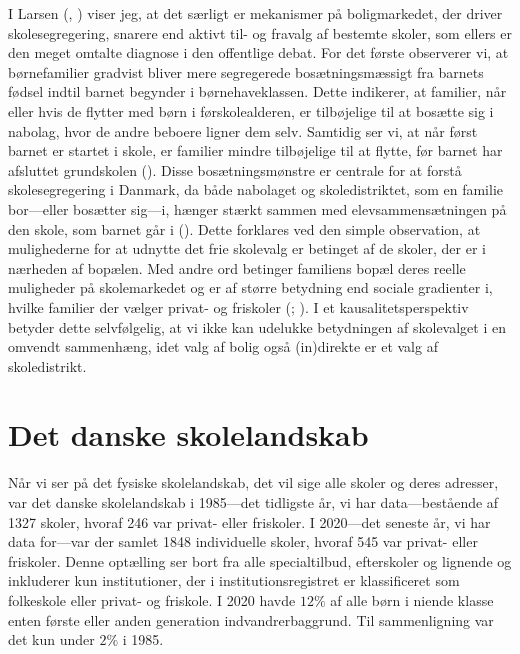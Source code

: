 \documentclass[
]{book}
\begin{document}
I Larsen (, ) viser jeg, at det særligt er mekanismer på boligmarkedet, der driver skolesegregering, snarere end aktivt til- og fravalg af bestemte skoler, som ellers er den meget omtalte diagnose i den offentlige debat. For det første observerer vi, at børnefamilier gradvist bliver mere segregerede bosætningsmæssigt fra barnets fødsel indtil barnet begynder i børnehaveklassen. Dette indikerer, at familier, når eller hvis de flytter med børn i førskolealderen, er tilbøjelige til at bosætte sig i nabolag, hvor de andre beboere ligner dem selv. Samtidig ser vi, at når først barnet er startet i skole, er familier mindre tilbøjelige til at flytte, før barnet har afsluttet grundskolen (). Disse bosætningsmønstre er centrale for at forstå skolesegregering i Danmark, da både nabolaget og skoledistriktet, som en familie bor---eller bosætter sig---i, hænger stærkt sammen med elevsammensætningen på den skole, som barnet går i (). Dette forklares ved den simple observation, at mulighederne for at udnytte det frie skolevalg er betinget af de skoler, der er i nærheden af bopælen. Med andre ord betinger familiens bopæl deres reelle muligheder på skolemarkedet og er af større betydning end sociale gradienter i, hvilke familier der vælger privat- og friskoler (; ). I et kausalitetsperspektiv betyder dette selvfølgelig, at vi ikke kan udelukke betydningen af skolevalget i en omvendt sammenhæng, idet valg af bolig også (in)direkte er et valg af skoledistrikt.

\section{Det danske skolelandskab}\label{det-danske-skolelandskab}

Når vi ser på det fysiske skolelandskab, det vil sige alle skoler og deres adresser, var det danske skolelandskab i 1985---det tidligste år, vi har data---bestående af 1327 skoler, hvoraf 246 var privat- eller friskoler. I 2020---det seneste år, vi har data for---var der samlet 1848 individuelle skoler, hvoraf 545 var privat- eller friskoler. Denne optælling ser bort fra alle specialtilbud, efterskoler og lignende og inkluderer kun institutioner, der i institutionsregistret er klassificeret som folkeskole eller privat- og friskole. I 2020 havde \(12\%\) af alle børn i niende klasse enten første eller anden generation indvandrerbaggrund. Til sammenligning var det kun under \(2\%\) i 1985.
\end{document}
